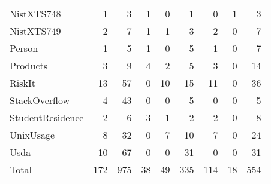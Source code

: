 \begin{table}[t!]
{\begin{tabular}{l@{\hskip -5pt}rrrrrrrr}
			NistXTS748 & 1 & 3 & 1 & 0 & 1 & 0 & 1 & 3 \\
			NistXTS749 & 2 & 7 & 1 & 1 & 3 & 2 & 0 & 7 \\
			Person & 1 & 5 & 1 & 0 & 5 & 1 & 0 & 7 \\
			Products & 3 & 9 & 4 & 2 & 5 & 3 & 0 & 14 \\
			RiskIt & 13 & 57 & 0 & 10 & 15 & 11 & 0 & 36 \\
			StackOverflow & 4 & 43 & 0 & 0 & 5 & 0 & 0 & 5 \\
			StudentResidence & 2 & 6 & 3 & 1 & 2 & 2 & 0 & 8 \\
			UnixUsage & 8 & 32 & 0 & 7 & 10 & 7 & 0 & 24 \\
			Usda & 10 & 67 & 0 & 0 & 31 & 0 & 0 & 31 \\
			\hline
			{Total} & 172 & 975 & 38 & 49 & 335 & 114 & 18 & 554 \\
			\hline

		\end{tabular}
	}
\end{table}
